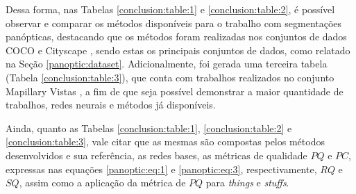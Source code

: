 Dessa forma, nas Tabelas \ref{conclusion:table:1} e \ref{conclusion:table:2}, é possível observar e comparar os métodos disponíveis para o trabalho com segmentações panópticas, destacando que os métodos foram realizadas nos conjuntos de dados COCO \cite{Lin2014} e Cityscape \cite{Cordts2016}, sendo estas os principais conjuntos de dados, como relatado na Seção \ref{panoptic:dataset}. Adicionalmente, foi gerada uma terceira tabela (Tabela \ref{conclusion:table:3}), que conta com trabalhos realizados no conjunto Mapillary Vistas \cite{Neuhold2017_ICCV}, a fim de que seja possível demonstrar a maior quantidade de trabalhos, redes neurais e métodos já disponíveis.

Ainda, quanto as Tabelas \ref{conclusion:table:1}, \ref{conclusion:table:2} e \ref{conclusion:table:3}, vale citar que as mesmas são compostas pelos métodos desenvolvidos e sua referência, as redes bases, as métricas de qualidade $PQ$ e $PC$, expressas nas equações \ref{panoptic:eq:1} e \ref{panoptic:eq:3}, respectivamente, $RQ$ e $SQ$, assim como a aplicação da métrica de $PQ$ para \textit{things} e \textit{stuffs}.

